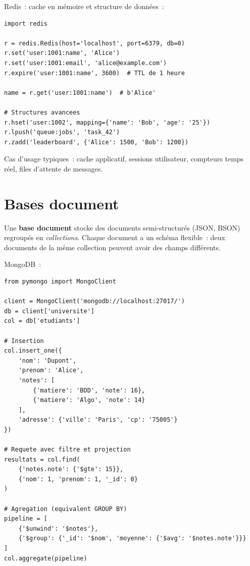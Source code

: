 \begin{exemple}
Redis~: cache en m\'emoire et structure de donn\'ees~:
\begin{verbatim}
import redis

r = redis.Redis(host='localhost', port=6379, db=0)
r.set('user:1001:name', 'Alice')
r.set('user:1001:email', 'alice@example.com')
r.expire('user:1001:name', 3600)  # TTL de 1 heure

name = r.get('user:1001:name')  # b'Alice'

# Structures avancees
r.hset('user:1002', mapping={'name': 'Bob', 'age': '25'})
r.lpush('queue:jobs', 'task_42')
r.zadd('leaderboard', {'Alice': 1500, 'Bob': 1200})
\end{verbatim}
\end{exemple}

\begin{remarque}
Cas d'usage typiques~: cache applicatif, sessions utilisateur,
compteurs temps r\'eel, files d'attente de messages.
\end{remarque}

\section{Bases document}

\begin{definition}
Une \textbf{base document} stocke des documents semi-structur\'es
(JSON, BSON) regroup\'es en \emph{collections}. Chaque document a un
sch\'ema flexible~: deux documents de la m\^eme collection peuvent avoir
des champs diff\'erents.
\end{definition}

\begin{exemple}
MongoDB~:
\begin{verbatim}
from pymongo import MongoClient

client = MongoClient('mongodb://localhost:27017/')
db = client['universite']
col = db['etudiants']

# Insertion
col.insert_one({
    'nom': 'Dupont',
    'prenom': 'Alice',
    'notes': [
        {'matiere': 'BDD', 'note': 16},
        {'matiere': 'Algo', 'note': 14}
    ],
    'adresse': {'ville': 'Paris', 'cp': '75005'}
})

# Requete avec filtre et projection
resultats = col.find(
    {'notes.note': {'$gte': 15}},
    {'nom': 1, 'prenom': 1, '_id': 0}
)

# Agregation (equivalent GROUP BY)
pipeline = [
    {'$unwind': '$notes'},
    {'$group': {'_id': '$nom', 'moyenne': {'$avg': '$notes.note'}}}
]
col.aggregate(pipeline)
\end{verbatim}
\end{exemple}

